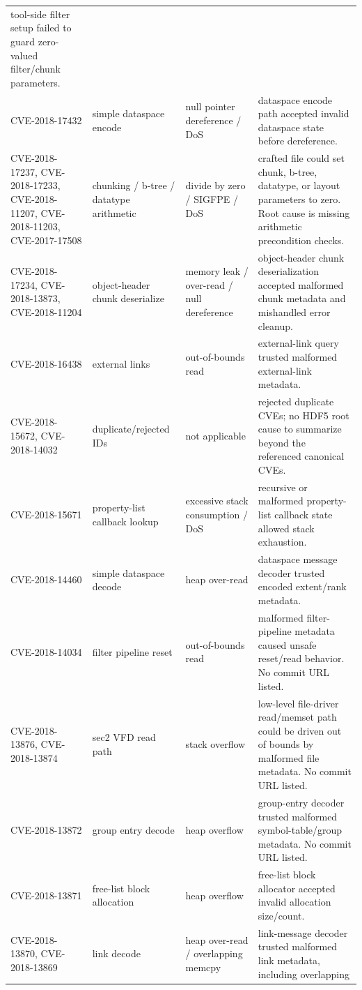 \documentclass[../main.tex]{subfiles}
\begin{document}
\begin{longtable}{@{}p{0.15\widetablewidth}p{0.20\widetablewidth}p{0.20\widetablewidth}p{0.44\widetablewidth}@{}}
tool-side filter setup failed to guard zero-valued filter/chunk parameters. \\
CVE-2018-17432 &
simple dataspace encode &
null pointer dereference / DoS &
dataspace encode path accepted invalid dataspace state before dereference. \\
CVE-2018-17237, CVE-2018-17233, CVE-2018-11207, CVE-2018-11203, CVE-2017-17508 &
chunking / b-tree / datatype arithmetic &
divide by zero / SIGFPE / DoS &
crafted file could set chunk, b-tree, datatype, or layout parameters to zero. Root
cause is missing arithmetic precondition checks. \\
CVE-2018-17234, CVE-2018-13873, CVE-2018-11204 &
object-header chunk deserialize &
memory leak / over-read / null dereference &
object-header chunk deserialization accepted malformed chunk metadata and mishandled
error cleanup. \\
CVE-2018-16438 &
external links &
out-of-bounds read &
external-link query trusted malformed external-link metadata. \\
CVE-2018-15672, CVE-2018-14032 &
duplicate/rejected IDs &
not applicable &
rejected duplicate CVEs; no HDF5 root cause to summarize beyond the referenced
canonical CVEs. \\
CVE-2018-15671 &
property-list callback lookup &
excessive stack consumption / DoS &
recursive or malformed property-list callback state allowed stack exhaustion. \\
CVE-2018-14460 &
simple dataspace decode &
heap over-read &
dataspace message decoder trusted encoded extent/rank metadata. \\
CVE-2018-14034 &
filter pipeline reset &
out-of-bounds read &
malformed filter-pipeline metadata caused unsafe reset/read behavior. No commit URL
listed. \\
CVE-2018-13876, CVE-2018-13874 &
sec2 VFD read path &
stack overflow &
low-level file-driver read/memset path could be driven out of bounds by malformed file
metadata. No commit URL listed. \\
CVE-2018-13872 &
group entry decode &
heap overflow &
group-entry decoder trusted malformed symbol-table/group metadata. No commit URL
listed. \\
CVE-2018-13871 &
free-list block allocation &
heap overflow &
free-list block allocator accepted invalid allocation size/count. \\
CVE-2018-13870, CVE-2018-13869 &
link decode &
heap over-read / overlapping memcpy &
link-message decoder trusted malformed link metadata, including overlapping

\end{longtable}
\end{document}
